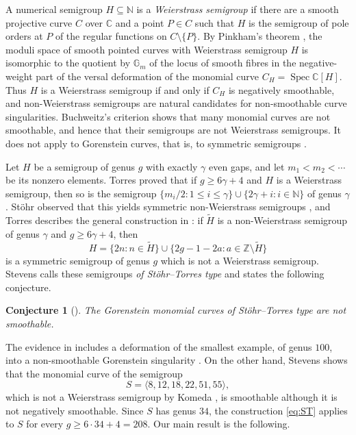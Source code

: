 \documentclass{amsart}
\newtheorem*{conjecture*}{Conjecture}
\theoremstyle{definition}
\theoremstyle{remark}
\numberwithin{equation}{section}
\newcommand{\C}{\mathbb{C}}
\newcommand{\N}{\mathbb{N}}
\newcommand{\Z}{\mathbb{Z}}
\newcommand{\Gm}{\mathbb{G}_m}
\DeclareMathOperator{\Spec}{Spec}
\begin{document}
A numerical semigroup $H\subseteq\N$ is a \emph{Weierstrass semigroup} if there are a smooth projective curve $C$ over $\C$ and a point $P\in C$ such that $H$ is the semigroup of pole orders at $P$ of the regular functions on $C\setminus\{P\}$. By Pinkham's theorem \cite[Theorem~2.12]{Ste}, the moduli space of smooth pointed curves with Weierstrass semigroup $H$ is isomorphic to the quotient by $\Gm$ of the locus of smooth fibres in the negative-weight part of the versal deformation of the monomial curve $C_H=\Spec\C[H]$. Thus $H$ is a Weierstrass semigroup if and only if $C_H$ is negatively smoothable, and non-Weierstrass semigroups are natural candidates for non-smoothable curve singularities. Buchweitz's criterion shows that many monomial curves are not smoothable, and hence that their semigroups are not Weierstrass semigroups. It does not apply to Gorenstein curves, that is, to symmetric semigroups \cite[\S 4.1]{Ste}.

Let $H$ be a semigroup of genus $g$ with exactly $\gamma$ even gaps, and let $m_1<m_2<\cdots$ be its nonzero elements. Torres proved that if $g\ge6\gamma+4$ and $H$ is a Weierstrass semigroup, then so is the semigroup $\{m_i/2:1\le i\le\gamma\}\cup\{2\gamma+i:i\in\N\}$ of genus $\gamma$ \cite[p.~48]{Tor}. St\"ohr observed that this yields symmetric non-Weierstrass semigroups \cite[Scholium~3.5 and its proof]{Tor}, and Torres describes the general construction in \cite[Remark~3.6]{Tor}: if $\tilde H$ is a non-Weierstrass semigroup of genus $\gamma$ and $g\ge 6\gamma+4$, then
\begin{equation}\label{eq:ST}
H=\{2n:n\in\tilde H\}\cup\{2g-1-2a:a\in\Z\setminus\tilde H\}
\end{equation}
is a symmetric semigroup of genus $g$ which is not a Weierstrass semigroup. Stevens calls these semigroups \emph{of St\"ohr--Torres type} \cite[\S 4.1]{Ste} and states the following conjecture.

\begin{conjecture*}[{\cite[Conjecture~4.3]{Ste}}]
The Gorenstein monomial curves of St\"ohr--Torres type are not smoothable.
\end{conjecture*}

The evidence in \cite{Ste} includes a deformation of the smallest example, of genus $100$, into a non-smoothable Gorenstein singularity \cite[Example~4.1 and Proposition~4.2]{Ste}. On the other hand, Stevens shows \cite[Example~2.13]{Ste} that the monomial curve of the semigroup
\begin{equation}\label{eq:S}
S=\langle 8,12,18,22,51,55\rangle,
\end{equation}
which is not a Weierstrass semigroup by Komeda \cite[Example~5.1]{Kom}, is smoothable although it is not negatively smoothable. Since $S$ has genus $34$, the construction \eqref{eq:ST} applies to $S$ for every $g\ge 6\cdot34+4=208$. Our main result is the following.
\end{document}
